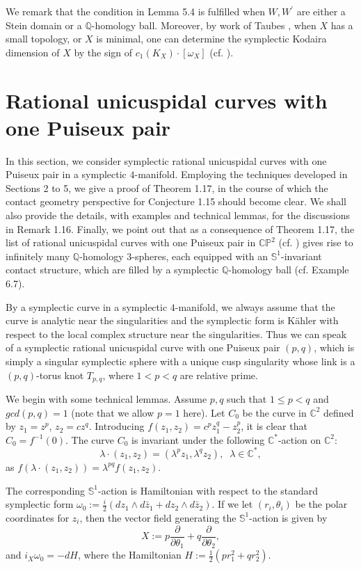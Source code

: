 \documentclass[11pt]{amsart}
\theoremstyle{plain}
\numberwithin{theorem}{section}
\theoremstyle{definition}
\newcommand{\C}{{\mathbb C}}
\newcommand{\Q}{{\mathbb Q}}
\renewcommand{\P}{{\mathbb P}}
\newcommand{\s}{{\mathbb S}}
\begin{document}
We remark that the condition in Lemma 5.4 is fulfilled when $W,W^\prime$ are either a Stein domain or a $\Q$-homology ball. Moreover, by work of Taubes \cite{T}, when $X$ has a small topology,
or $X$ is minimal, one can determine the symplectic Kodaira dimension of $X$ by the sign of
$c_1(K_X)\cdot [\omega_X]$ (cf. \cite{Li}). 

\section{Rational unicuspidal curves with one Puiseux pair}

In this section, we consider symplectic rational unicuspidal curves with one Puiseux pair in a symplectic $4$-manifold. Employing the techniques developed in Sections 2 to 5, we give a proof of Theorem 1.17, in the course of which the contact geometry perspective for Conjecture 1.15 should become clear. We shall also provide the details, with examples and technical lemmas, for the discussions in Remark 1.16. Finally, we point out that as a consequence of Theorem 1.17, the list of rational unicuspidal curves with one Puiseux pair in $\C\P^2$ (cf. \cite{F}) 
gives rise to infinitely many $\Q$-homology $3$-spheres, each equipped with an $\s^1$-invariant contact structure, 
which are filled by a symplectic $\Q$-homology ball (cf. Example 6.7). 

By a symplectic curve in a symplectic $4$-manifold, we always assume that the curve is analytic near the singularities and the symplectic form is K\"{a}hler with respect to the local complex structure near the singularities. Thus we can speak of a symplectic rational unicuspidal curve with one Puiseux pair $(p,q)$, which is simply a singular symplectic sphere with a unique cusp singularity whose link is a $(p,q)$-torus knot $T_{p,q}$, where $1<p<q$ are relative prime. 

We begin with some technical lemmas. Assume $p,q$ such that $1\leq p<q$ and $gcd(p,q)=1$ 
(note that we allow $p=1$ here). Let $C_0$ be the curve in $\C^2$ defined by $z_1=z^p$, 
$z_2=cz^q$. Introducing $f(z_1,z_2)=c^pz_1^q-z_2^p$, it is clear that $C_0=f^{-1}(0)$. 
The curve $C_0$ is invariant under the following $\C^\ast$-action on $\C^2$:
$$
\lambda\cdot (z_1,z_2)=(\lambda^p z_1,\lambda^q z_2), \;\; \lambda\in\C^\ast,
$$
as $f(\lambda\cdot (z_1,z_2))=\lambda^{pq}f(z_1,z_2)$.

The corresponding $\s^1$-action is Hamiltonian with respect to the standard symplectic form
$\omega_0:=\frac{i}{2}(dz_1\wedge d\bar{z}_1+dz_2\wedge d\bar{z}_2)$. If we let $(r_i,\theta_i)$ be the polar coordinates for $z_i$, then the vector field generating 
the $\s^1$-action is given by
$$
X:=p\frac{\partial}{\partial \theta_1}+q\frac{\partial}{\partial \theta_2},
$$
and $i_X\omega_0=-dH$, where the Hamiltonian $H:=\frac{1}{2}(pr_1^2+qr_2^2)$.
\end{document}
